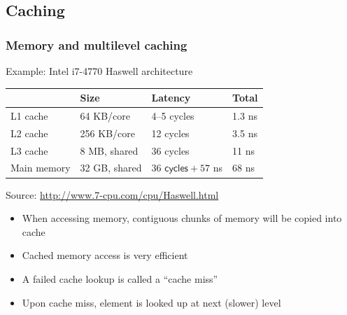 \documentclass[usenames,dvipsnames,mathserif,compress]{beamer}
\begin{document}
\subsection*{Caching}

\begin{frame}
  \frametitle{Memory and multilevel caching}
  Example: Intel i7-4770 Haswell architecture\\
  \medskip
  \begin{tabular}{llll}
     & Size & Latency & Total \\
    \hline\hline
    L1 cache & 64 KB/core & 4--5 cycles & 1.3 ns\\
    L2 cache & 256 KB/core & 12 cycles & 3.5 ns \\
    L3 cache & 8 MB, shared & 36 cycles & 11 ns\\
    Main memory & 32 GB, shared & $36\textsf{ cycles} + 57$ ns & 68 ns\\\hline\hline
  \end{tabular}
  Source: \url{http://www.7-cpu.com/cpu/Haswell.html}
  \bigskip
  \begin{itemize}
  \item When accessing memory, contiguous chunks of memory will be copied into cache
  \item Cached memory access is very efficient
  \item A failed cache lookup is called a ``cache miss''
  \item Upon cache miss, element is looked up at next (slower) level
  \end{itemize}

\end{frame}
\end{document}
